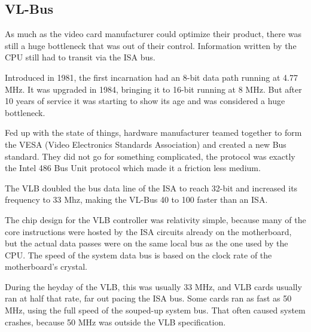 \subsection{VL-Bus}
As much as the video card manufacturer could optimize their product, there was still a huge bottleneck that was out of their control. Information written by the CPU still had to transit via the ISA bus.\\
\par
 Introduced in 1981, the first incarnation had an 8-bit data path running at 4.77 MHz. It was upgraded in 1984, bringing it to 16-bit running at 8 MHz. But after 10 years of service it was starting to show its age and was considered a huge bottleneck.\\
\par
{}
\par
Fed up with the state of things, hardware manufacturer teamed together to form the VESA (Video Electronics Standards Association) and created a new Bus standard. They did not go for something complicated, the protocol was exactly the Intel 486 Bus Unit protocol which made it a friction less medium.\\
\par 
The VLB doubled the bus data line of the ISA to reach 32-bit and increased its frequency to 33 Mhz, making the VL-Bus 40 to 100 faster than an ISA.\\
\par
The chip design for the VLB controller was relativity simple, because many of the core instructions were hosted by the ISA circuits already on the motherboard, but the actual data passes were on the same local bus as the one used by the CPU.
The speed of the system data bus is based on the clock rate of the motherboard's crystal. 
\par
During the heyday of the VLB, this was usually 33 MHz, and VLB cards usually ran at half that rate, far out pacing the ISA bus. Some cards ran as fast as 50 MHz, using the full speed of the souped-up system bus. That often caused system crashes, because 50 MHz was outside the VLB specification.\\
\par
{}\\
\par

